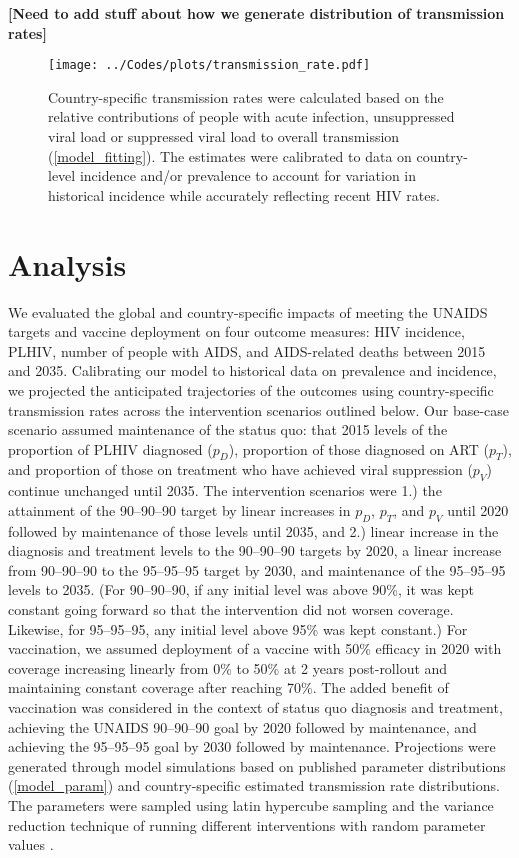 \documentclass[11pt]{article}
\newcommand{\comment}[1]{\textbf{[#1]}}
\begin{document}
\comment{Need to add stuff about how we generate distribution of
  transmission rates}




\begin{figure}
  \centering
  \texttt{[image: ../Codes/plots/transmission\_rate.pdf]}
  \caption{Country-specific transmission rates were calculated based
    on the relative contributions of people with acute infection,
    unsuppressed viral load or suppressed viral load to overall
    transmission (\autoref{model_fitting}). The estimates were
    calibrated to data on country-level incidence and/or prevalence to
    account for variation in historical incidence while accurately
    reflecting recent HIV rates.}
  \label{transmission_rate}
\end{figure}


\section{Analysis}

We evaluated the global and country-specific impacts of meeting the
UNAIDS targets and vaccine deployment on four outcome measures: HIV
incidence, PLHIV, number of people with AIDS, and AIDS-related deaths
between 2015 and 2035. Calibrating our model to historical data on
prevalence and incidence, we projected the anticipated trajectories of
the outcomes using country-specific transmission rates across the
intervention scenarios outlined below.  Our base-case scenario assumed
maintenance of the status quo: that 2015 levels of the proportion of
PLHIV diagnosed ($p_{D}$), proportion of those diagnosed on ART
($p_{T}$), and proportion of those on treatment who have achieved
viral suppression ($p_{V}$) continue unchanged until 2035.  The
intervention scenarios were 1.) the attainment of the 90--90--90
target by linear increases in $p_{D}$, $p_{T}$, and $p_{V}$ until 2020
followed by maintenance of those levels until 2035, and 2.) linear
increase in the diagnosis and treatment levels to the 90--90--90
targets by 2020, a linear increase from 90--90--90 to the 95--95--95
target by 2030, and maintenance of the 95--95--95 levels to 2035. (For
90--90--90, if any initial level was above 90\%, it was kept constant
going forward so that the intervention did not worsen coverage.
Likewise, for 95--95--95, any initial level above 95\% was kept
constant.)  For vaccination, we assumed deployment of a vaccine with
50\% efficacy in 2020 with coverage increasing linearly from 0\% to
50\% at 2 years post-rollout and maintaining constant coverage after
reaching 70\%. The added benefit of vaccination was considered in the
context of status quo diagnosis and treatment, achieving the UNAIDS
90–90–90 goal by 2020 followed by maintenance, and achieving the
95–95–95 goal by 2030 followed by maintenance.  Projections were
generated through model simulations based on published parameter
distributions (\autoref{model_param}) and country-specific estimated
transmission rate distributions. The parameters were sampled using
latin hypercube sampling \cite{blower1994} and the variance reduction
technique of running different interventions with random parameter
values \cite{shechter2006}.
\end{document}
